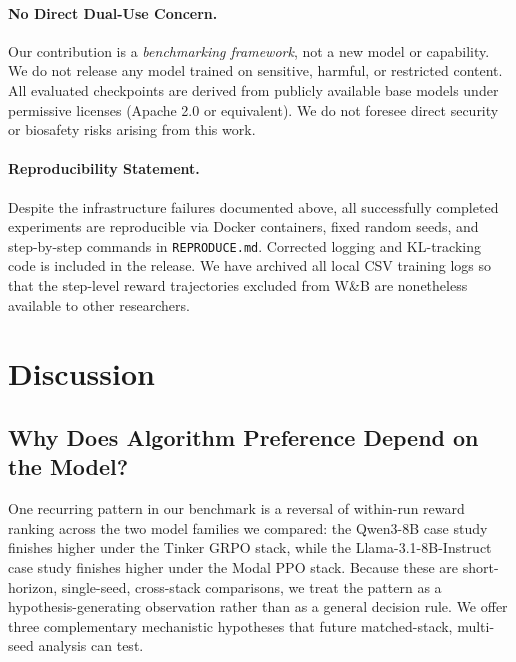 \documentclass{article}
\begin{document}
\paragraph{No Direct Dual-Use Concern.}
Our contribution is a \emph{benchmarking framework}, not a new model or
capability. We do not release any model trained on sensitive, harmful, or
restricted content. All evaluated checkpoints are derived from publicly
available base models under permissive licenses (Apache 2.0 or equivalent).
We do not foresee direct security or biosafety risks arising from this work.

\paragraph{Reproducibility Statement.}
Despite the infrastructure failures documented above, all successfully
completed experiments are reproducible via Docker containers, fixed random
seeds, and step-by-step commands in \texttt{REPRODUCE.md}. Corrected logging
and KL-tracking code is included in the release. We have archived all local
CSV training logs so that the step-level reward trajectories excluded from
W\&B are nonetheless available to other researchers.

\section{Discussion}
\label{sec:discussion}

\subsection{Why Does Algorithm Preference Depend on the Model?}
\label{sec:discuss_model_algo}

One recurring pattern in our benchmark is a reversal of within-run reward
ranking across the two model families we compared: the Qwen3-8B case study
finishes higher under the Tinker GRPO stack, while the Llama-3.1-8B-Instruct
case study finishes higher under the Modal PPO stack. Because these are
short-horizon, single-seed, cross-stack comparisons, we treat the pattern as a
hypothesis-generating observation rather than as a general decision rule. We
offer three complementary mechanistic hypotheses that future matched-stack,
multi-seed analysis can test.
\end{document}
